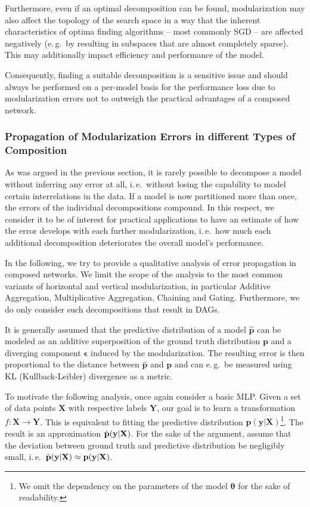 Furthermore, even if an optimal decomposition can be found, modularization may also affect the topology of the search space in a way that the inherent characteristics of optima finding algorithms -- most commonly SGD -- are affected negatively (e.\,g.\ by resulting in subspaces that are almost completely sparse). This may additionally impact efficiency and performance of the model.

Consequently, finding a suitable decomposition is a sensitive issue and should always be performed on a per-model basis for the performance loss due to modularization errors not to outweigh the practical advantages of a composed network.

\subsubsection{Propagation of Modularization Errors in different Types of Composition%
            \label{sec:compnet_error_propagation}}

As was argued in the previous section, it is rarely possible to decompose a model without inferring any error at all, i.\,e.\ without losing the capability to model certain interrelations in the data. If a model is now partitioned more than once, the errors of the individual decompositions compound. In this respect, we consider it to be of interest for practical applications to have an estimate of how the error develops with each further modularization, i.\,e.\ how much each additional decomposition deteriorates the overall model's performance.

In the following, we try to provide a qualitative analysis of error propagation in composed networks. We limit the scope of the analysis to the most common variants of horizontal and vertical modularization, in particular Additive Aggregation, Multiplicative Aggregation, Chaining and Gating. Furthermore, we do only consider such decompositions that result in DAGs.

It is generally assumed that the predictive distribution of a model $\hat{\textbf{p}}$ can be modeled as an additive superposition of the ground truth distribution $\textbf{p}$ and a diverging component $\boldsymbol{\epsilon}$ induced by the modularization. The resulting error is then proportional to the distance between $\hat{\textbf{p}}$ and $\textbf{p}$ and can e.\,g.\ be measured using KL (Kullback-Leibler) divergence as a metric.

To motivate the following analysis, once again consider a basic MLP. Given a set of data points $\textbf{X}$ with respective labels $\textbf{Y}$, our goal is to learn a transformation $f:\textbf{X}\rightarrow\textbf{Y}$. This is equivalent to fitting the predictive distribution $\textbf{p}(\textbf{y}|\textbf{X})$\footnote{We omit the dependency on the parameters of the model $\boldsymbol{\theta}$ for the sake of readability.}. The result is an approximation $\Tilde{\textbf{p}}(\textbf{y}|\textbf{X})$. For the sake of the argument, assume that the deviation between ground truth and predictive distribution be negligibly small, i.\,e.\ $
\Tilde{\textbf{p}}(\textbf{y}|\textbf{X})\approx\textbf{p}(\textbf{y}|\textbf{X})$.

